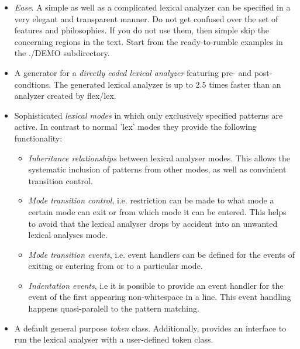 \begin{itemize}

\item {\it Ease}. A simple as well as a complicated lexical analyzer can 
      be specified in a very elegant and transparent manner. Do not get confused
      over the set of features and philosophies. If you do not use them, then
      simple skip the concerning regions in the text. Start from the ready-to-rumble
      examples in the ./DEMO subdirectory.

\item A generator for a {\it directly coded lexical analyzer} featuring
  pre- and post-condtions. The generated lexical analyzer is up to 2.5 times
  faster than an analyzer created by flex/lex.
  
\item Sophisticated {\it lexical modes} in which only exclusively specified
  patterns are active. In contrast to normal 'lex' modes they provide
  the following functionality:

  \begin{itemize}
  \item  {\it Inheritance relationships} between lexical analyser modes. This
    allows the systematic inclusion of patterns from other modes, as well as
    convinient transition control.

  \item {\it Mode transition control}, i.e. restriction can be made to what mode
    a certain mode can exit or from which mode it can be entered. This helps 
    to avoid that the lexical analyser drops by accident into an unwanted
    lexical analyses mode.

  \item {\it Mode transition events}, i.e. event handlers can be defined for
    the events of exiting or entering from or to a particular mode.    
    
  \item {\it Indentation events}, i.e it is possible to provide an event handler
    for the event of the first appearing non-whitespace in a line. This event
    handling happens quasi-paralell to the pattern matching.

  \end{itemize}
  
\item A default general purpose {\it token} class. Additionally, {\Quex}
  provides an interface to run the lexical analyser with a user-defined token
  class.
  

\end{itemize}
